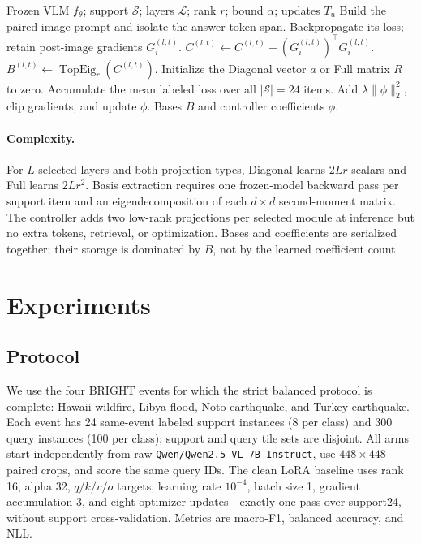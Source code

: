 \documentclass[conference]{IEEEtran}
\newcommand{\KVTTT}{\textsc{KV-TTT}}
\begin{document}
\begin{algorithm}[t]
\small
\caption{Supervised event-level \KVTTT{}}
\label{alg:kvttt}
\begin{algorithmic}[1]
\REQUIRE Frozen VLM $f_\theta$; support $\mathcal S$; layers $\mathcal L$;
rank $r$; bound $\alpha$; updates $T_u$
  \STATE Build the paired-image prompt and isolate the answer-token span.
  \STATE Backpropagate its loss; retain post-image gradients $G_i^{(l,t)}$.
  \STATE $C^{(l,t)}\leftarrow C^{(l,t)}+(G_i^{(l,t)})^\top G_i^{(l,t)}$.
\ENDFOR
{}
  \STATE $B^{(l,t)}\leftarrow\operatorname{TopEig}_r(C^{(l,t)})$.
  \STATE Initialize the Diagonal vector $a$ or Full matrix $R$ to zero.
\ENDFOR
{}
  \STATE Accumulate the mean labeled loss over all $|\mathcal S|=24$ items.
  \STATE Add $\lambda\lVert\phi\rVert_2^2$, clip gradients, and update $\phi$.
\ENDFOR
\RETURN Bases $B$ and controller coefficients $\phi$.
\end{algorithmic}
\end{algorithm}

\paragraph{Complexity.}
For $L$ selected layers and both projection types, Diagonal learns $2Lr$
scalars and Full learns $2Lr^2$. Basis extraction requires one frozen-model
backward pass per support item and an eigendecomposition of each $d\times d$
second-moment matrix. The controller adds two low-rank projections per selected
module at inference but no extra tokens, retrieval, or optimization. Bases and
coefficients are serialized together; their storage is dominated by $B$, not
by the learned coefficient count.

\section{Experiments}
\subsection{Protocol}
We use the four \textsc{BRIGHT} events for which the strict balanced protocol
is complete: Hawaii wildfire, Libya flood, Noto earthquake, and Turkey
earthquake. Each event has 24 same-event labeled support instances (8 per
class) and 300 query instances (100 per class); support and query tile sets are
disjoint. All arms start independently from raw
\texttt{Qwen/Qwen2.5-VL-7B-Instruct}, use $448\times448$ paired crops, and score
the same query IDs. The clean LoRA baseline uses rank 16, alpha 32,
$q/k/v/o$ targets, learning rate $10^{-4}$, batch size 1, gradient accumulation
3, and eight optimizer updates---exactly one pass over support24, without
support cross-validation. Metrics are macro-F1, balanced accuracy, and NLL.
\end{document}
